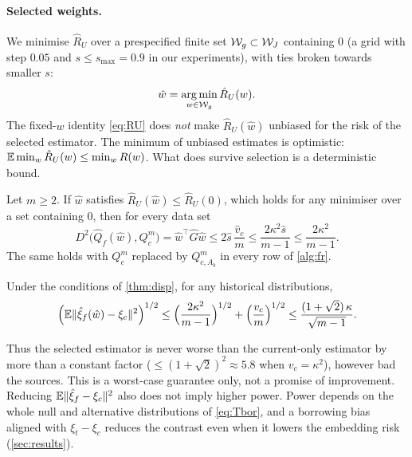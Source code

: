 \documentclass[11pt,a4paper]{article}
\begin{document}
\paragraph{Selected weights.} We minimise $\hat R_U$ over a prespecified finite set $\mathcal W_g\subset\mathcal{W}_J$ containing $0$ (a grid with step $0.05$ and $s\le s_{\max}=0.9$ in our experiments), with ties broken towards smaller $s$:
\[
\hat w=\operatorname*{arg\,min}_{w\in\mathcal W_g}\hat R_U(w).
\]
The fixed-$w$ identity \eqref{eq:RU} does \emph{not} make $\hat R_U(\hat w)$ unbiased for the risk of the selected estimator. The minimum of unbiased estimates is optimistic: $\mathbb{E}\min_w\hat R_U(w)\le\min_wR(w)$. What does survive selection is a deterministic bound.

\begin{theorem}\label{thm:disp}
Let $m\ge2$. If $\hat w$ satisfies $\hat R_U(\hat w)\le\hat R_U(0)$, which holds for any minimiser over a set containing $0$, then for every data set
\[
D^2\big(\hat Q_f(\hat w),Q_c^m\big)=\hat w^\top\hat G\hat w\le 2\hat s\,\frac{\hat v_c}{m}\le\frac{2\kappa^2\hat s}{m-1}\le\frac{2\kappa^2}{m-1}.
\]
The same holds with $Q_c^m$ replaced by $Q^m_{c,A_b}$ in every row of \cref{alg:fr}.
\end{theorem}

\begin{proposition}\label{prop:safety}
Under the conditions of \cref{thm:disp}, for any historical distributions,
\[
\Big(\mathbb{E}\lVert \hat\xi_f(\hat w)-\xi_c\rVert^2\Big)^{1/2}\le\Big(\frac{2\kappa^2}{m-1}\Big)^{1/2}+\Big(\frac{v_c}{m}\Big)^{1/2}\le\frac{(1+\sqrt2)\,\kappa}{\sqrt{m-1}} .
\]
\end{proposition}

Thus the selected estimator is never worse than the current-only estimator by more than a constant factor ($\le(1+\sqrt2)^2\approx5.8$ when $v_c=\kappa^2$), however bad the sources. This is a worst-case guarantee only, not a promise of improvement. Reducing $\mathbb{E}\lVert \hat\xi_f-\xi_c\rVert^2$ also does not imply higher power. Power depends on the whole null and alternative distributions of \eqref{eq:Tbor}, and a borrowing bias aligned with $\xi_t-\xi_c$ reduces the contrast even when it lowers the embedding risk (\cref{sec:results}).
\end{document}
